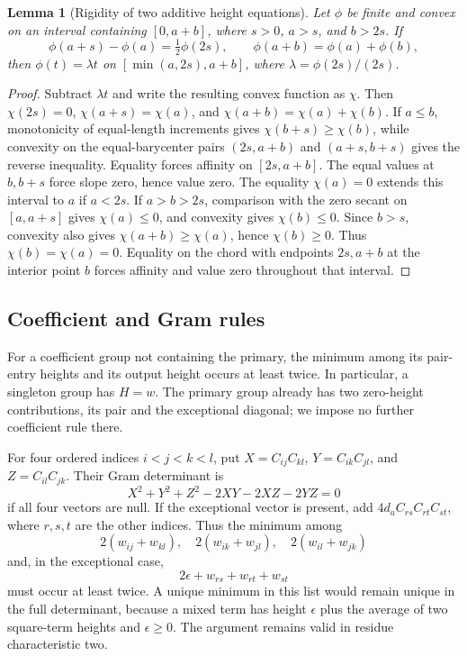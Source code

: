 \documentclass[11pt]{article}
\newtheorem{lemma}[theorem]{Lemma}
\theoremstyle{remark}\newtheorem{remark}[theorem]{Remark}
\begin{document}
\begin{lemma}[Rigidity of two additive height equations]\label{lem:rigidity}
Let $\phi$ be finite and convex on an interval containing $[0,a+b]$,
where $s>0$, $a>s$, and $b>2s$. If
\[
 \phi(a+s)-\phi(a)=\tfrac12\phi(2s),\qquad
 \phi(a+b)=\phi(a)+\phi(b),
\]
then $\phi(t)=\lambda t$ on $[\min(a,2s),a+b]$, where
$\lambda=\phi(2s)/(2s)$.
\end{lemma}
\begin{proof}
Subtract $\lambda t$ and write the resulting convex function as $\chi$.
Then $\chi(2s)=0$, $\chi(a+s)=\chi(a)$, and
$\chi(a+b)=\chi(a)+\chi(b)$.
If $a\le b$, monotonicity of equal-length increments gives
$\chi(b+s)\ge\chi(b)$, while convexity on the equal-barycenter pairs
$(2s,a+b)$ and $(a+s,b+s)$ gives the reverse inequality.
Equality forces affinity on $[2s,a+b]$. The equal values at $b,b+s$
force slope zero, hence value zero. The equality $\chi(a)=0$ extends
this interval to $a$ if $a<2s$.
If $a>b>2s$, comparison with the zero secant on $[a,a+s]$ gives
$\chi(a)\le0$, and convexity gives $\chi(b)\le0$. Since $b>s$,
convexity also gives $\chi(a+b)\ge\chi(a)$, hence $\chi(b)\ge0$.
Thus $\chi(b)=\chi(a)=0$. Equality on the chord with endpoints
$2s,a+b$ at the interior point $b$ forces affinity and value zero
throughout that interval.
\end{proof}

\subsection{Coefficient and Gram rules}

For a coefficient group not containing the primary, the minimum among
its pair-entry heights and its output height occurs at least twice.
In particular, a singleton group has $H=w$. The primary group already
has two zero-height contributions, its pair and the exceptional
diagonal; we impose no further coefficient rule there.

For four ordered indices $i<j<k<l$, put
$X=C_{ij}C_{kl}$, $Y=C_{ik}C_{jl}$, and $Z=C_{il}C_{jk}$.
Their Gram determinant is
\begin{equation}\label{eq:gram}
 X^2+Y^2+Z^2-2XY-2XZ-2YZ=0
\end{equation}
if all four vectors are null. If the exceptional vector is present,
add $4d_a C_{rs}C_{rt}C_{st}$, where $r,s,t$ are the other indices.
Thus the minimum among
\begin{equation}\label{eq:minimum}
 2(w_{ij}+w_{kl}),\quad2(w_{ik}+w_{jl}),\quad2(w_{il}+w_{jk})
\end{equation}
and, in the exceptional case,
\[
 2\epsilon+w_{rs}+w_{rt}+w_{st}
\]
must occur at least twice. A unique minimum in this list would remain
unique in the full determinant, because a mixed term has height
$\epsilon$ plus the average of two square-term heights and
$\epsilon\ge0$. The argument remains valid in residue characteristic two.
\end{document}

